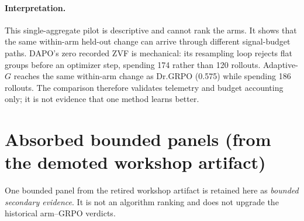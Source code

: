\documentclass[11pt]{article}
\newcommand{\zvf}{\textnormal{ZVF}}
\newcommand{\grpo}{\textsc{GRPO}}
\begin{document}
\paragraph{Interpretation.} This single-aggregate pilot is descriptive and cannot rank
the arms. It shows that the same within-arm held-out change can arrive through
different signal-budget paths. DAPO's zero recorded \zvf{} is mechanical: its
resampling loop rejects flat groups before an optimizer step, spending 174
rather than 120 rollouts. Adaptive-$G$ reaches the same within-arm change as
Dr.\grpo{} (0.575) while spending 186 rollouts. The comparison therefore validates telemetry and budget
accounting only; it is not evidence that one method learns better.


\section{Absorbed bounded panels (from the demoted workshop artifact)}
\label{sec:absorbed-p8}

One bounded panel from the retired workshop artifact is retained
here as \emph{bounded secondary evidence}. It is not an algorithm ranking and
does not upgrade the historical arm--GRPO verdicts.
\end{document}
